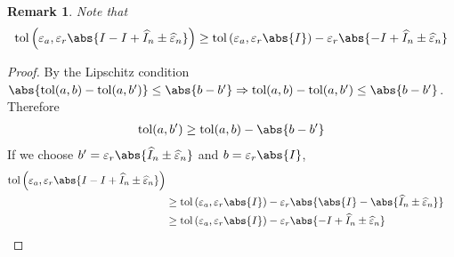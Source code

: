 \documentclass[]{elsarticle}
\newtheorem{remark}{Remark}
\theoremstyle{definition}
\newcommand{\tol}{\text{tol}}
\begin{document}
\begin{remark}
Note that
\[
\tol\left(\varepsilon_a,\varepsilon_r\abs{I-I+\widehat{I}_n\pm\widehat{\varepsilon}_n}\right)
\geq \tol\left(\varepsilon_a,\varepsilon_r\abs{I}\right)-\varepsilon_r\abs{-I+\widehat{I}_n\pm\widehat{\varepsilon}_n}
\]
\end{remark}
\begin{proof}
By the Lipschitz condition $\abs{\tol(a,b)-\tol(a,b')}\leq \abs{b-b'}\Rightarrow \tol(a,b)-\tol(a,b')\leq \abs{b-b'}$. Therefore
\begin{align*}
\tol(a,b')\geq\tol(a,b)-\abs{b-b'}
\end{align*}
If we choose $b'=\varepsilon_r\abs{\widehat{I}_n\pm\widehat{\varepsilon}_n}$ and $b=\varepsilon_r\abs{I}$,
\begin{align*}
\tol\left(\varepsilon_a,\varepsilon_r\abs{I-I+\widehat{I}_n\pm\widehat{\varepsilon}_n}\right)\\
&\geq \tol\left(\varepsilon_a,\varepsilon_r\abs{I}\right)-\varepsilon_r\abs{\abs{I}-\abs{\widehat{I}_n\pm\widehat{\varepsilon}_n}}\\
&\geq \tol\left(\varepsilon_a,\varepsilon_r\abs{I}\right)-\varepsilon_r\abs{-I+\widehat{I}_n\pm\widehat{\varepsilon}_n}
\end{align*}
\end{proof}
\end{document}
